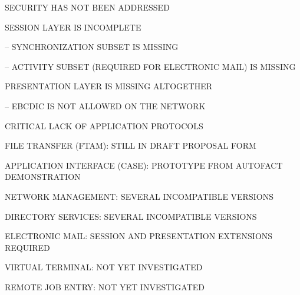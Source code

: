 \small
\begin{bwslide}
\vskip-0.5in
\end	{bwslide}

\begin{bwslide}
\vskip-0.5in
\end	{bwslide}

\normalsize
\begin{bwslide}

\begin	{nrtc}
\item	SECURITY HAS NOT BEEN ADDRESSED
\item	SESSION LAYER IS INCOMPLETE
	\begin	{nrtc}
	\item	-- SYNCHRONIZATION SUBSET IS MISSING
	\item	-- ACTIVITY SUBSET (REQUIRED FOR ELECTRONIC MAIL) IS MISSING
	\end	{nrtc}
\item	PRESENTATION LAYER IS MISSING ALTOGETHER
	\begin	{nrtc}
	\item	-- EBCDIC IS NOT ALLOWED ON THE NETWORK
	\end	{nrtc}
\end	{nrtc}
\end	{bwslide}

\begin{bwslide}

\begin	{nrtc}
\item	CRITICAL LACK OF APPLICATION PROTOCOLS
	\begin	{nrtc}
	\item	FILE TRANSFER (FTAM): STILL IN DRAFT PROPOSAL FORM
	\item	APPLICATION INTERFACE (CASE): PROTOTYPE FROM AUTOFACT
		DEMONSTRATION
	\item	NETWORK MANAGEMENT: SEVERAL INCOMPATIBLE VERSIONS
	\item	DIRECTORY SERVICES: SEVERAL INCOMPATIBLE VERSIONS
	\item	ELECTRONIC MAIL: SESSION AND PRESENTATION EXTENSIONS
		REQUIRED
	\item	VIRTUAL TERMINAL: NOT YET INVESTIGATED
	\item	REMOTE JOB ENTRY: NOT YET INVESTIGATED
	\end	{nrtc}
\end	{nrtc}
\end	{bwslide}

